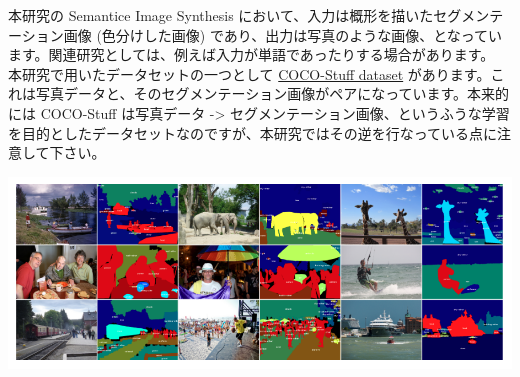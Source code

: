 \documentclass[a4paper, dvipdfmx, 10pt]{article}
\begin{document}
本研究の Semantice Image Synthesis において、入力は概形を描いたセグメンテーション画像 (色分けした画像) であり、出力は写真のような画像、となっています。関連研究としては、例えば入力が単語であったりする場合があります。\\

本研究で用いたデータセットの一つとして \href{https://github.com/nightrome/cocostuff}{COCO-Stuff dataset} があります。これは写真データと、そのセグメンテーション画像がペアになっています。本来的には COCO-Stuff は写真データ -> セグメンテーション画像、というふうな学習を目的としたデータセットなのですが、本研究ではその逆を行なっている点に注意して下さい。\\

\begin{center}
\includegraphics[width=18cm]{./coco.png}
\end{center}
\end{document}

